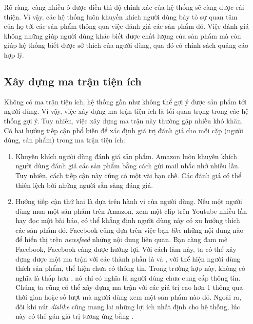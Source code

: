 Rõ ràng, càng nhiều ô được điền thì độ chính xác của hệ thống sẽ càng được cải
thiện. Vì vậy, các hệ thống luôn khuyến khích người dùng {bày tỏ} sự quan tâm
của họ tới các sản phẩm thông qua việc đánh giá các sản phẩm đó. Việc đánh giá
không những giúp người dùng khác biết được chất lượng của sản phẩm mà còn giúp
hệ thống {biết} được sở thích của người dùng, qua đó có chính sách quảng cáo hợp
lý.
 
 
\subsection{Xây dựng ma trận tiện ích}
 
Không có ma trận tiện ích, hệ thống gần như không thể gợi ý được sản phẩm tới
người dùng. Vì vậy, việc xây dựng ma trận tiện ích là tối quan trọng trong các
hệ thống gợi ý. Tuy nhiên, việc xây dựng ma trận này thường gặp nhiều khó khăn.
Có hai hướng tiếp cận phổ biến để xác định giá trị đánh giá cho mỗi cặp (người
dùng, sản phẩm) trong ma trận tiện ích:
\vspace{-0.25cm}
\begin{enumerate}
    \item Khuyến khích người dùng đánh giá sản phẩm. Amazon luôn
    khuyến khích người dùng đánh giá các sản phẩm bằng cách gửi mail nhắc nhở
    nhiều lần. Tuy nhiên, cách tiếp cận này cũng có một vài hạn chế. Các đánh
    giá có thể thiên lệch bởi những người sẵn sàng đáng giá.
     
    \item Hướng tiếp cận thứ hai là dựa trên hành vi của người dùng. Nếu một
    người dùng mua một sản phẩm trên Amazon, xem một clip trên Youtube
    nhiều lần hay đọc một bài báo, có thể khẳng định người dùng
    này {có xu hướng} thích các sản phẩm đó. Facebook cũng dựa trên việc
    bạn \textit{like} những nội dung nào để hiển thị trên \textit{newsfeed}  những nội dung liên quan. Bạn càng đam mê Facebook, Facebook càng được
    hưởng lợi. Với cách làm này, ta có thể xây dựng được một ma
    trận với các thành phần là  và , với
     thể hiện người dùng thích sản phẩm,
     thể hiện chưa có thông tin. Trong trường hợp này,
     không có nghĩa là thấp hơn , nó chỉ có
    nghĩa là người dùng chưa cung cấp thông tin. Chúng ta cũng có thể xây
    dựng ma trận với các giá trị cao hơn 1 thông qua thời gian hoặc số lượt mà
    người dùng xem một sản phẩm nào đó. Ngoài ra, đôi khi nút
    \textit{dislike}
    cũng mang lại những lợi ích nhất định cho hệ thống, lúc này có thể gán giá
    trị tương ứng bằng
    .
\end{enumerate}
 
